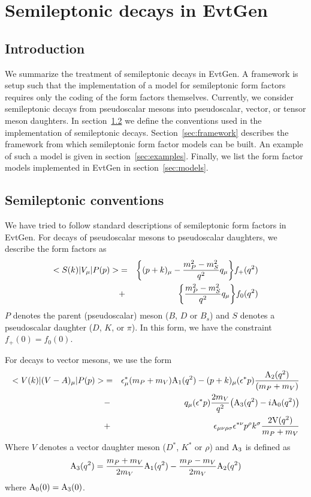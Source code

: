 \section{Semileptonic decays in EvtGen}
\label{semileptonic}

\label{Semileptonic decays}
\subsection{Introduction}
We summarize the treatment of semileptonic decays in
EvtGen.  A framework is setup such that the implementation of
a model for semileptonic form factors requires only the 
coding of the form factors themselves.  Currently, we consider
semileptonic decays from pseudoscalar mesons into 
pseudoscalar, vector, or tensor meson daughters.
In section~\ref{sec:conventions} we define the
conventions used in the implementation of semileptonic
decays.  Section~\ref{sec:framework} describes the framework
from which semileptonic form factor models can be built.  An
example of such a model is given in section~\ref{sec:examples}.
Finally, we list the form factor models implemented in EvtGen
in section~\ref{sec:models}.

\subsection{Semileptonic conventions}
\label{sec:conventions}
We have tried to follow standard descriptions of semileptonic
form factors in EvtGen.  
For decays of 
pseudoscalar mesons to pseudoscalar daughters, we describe the
form factors as
\begin{eqnarray}
<S(k) \vert V_{\mu} \vert P(p) > & = &\biggl \{ (p+k)_{\mu} - 
{{m_P^2 - m_S^2} \over {q^2}} q_{\mu} \biggr \} f_+(q^2) \\
&+& 
\biggl \{  {{m_P^2 - m_S^2} \over {q^2}} q_{\mu} \biggr \} f_0(q^2) 
\nonumber
\end{eqnarray}
$P$ denotes the parent (pseudoscalar) meson ($B$, $D$ or $B_s$) and 
$S$ denotes a pseudoscalar daughter ($D$, $K$, or $\pi$).  In this
form, we have the constraint $f_+(0) = f_0(0)$. 

\noindent
For decays to vector mesons, we use the form
\begin{eqnarray}
<V(k) \vert (V-A)_{\mu} \vert P(p) > & = & 
 \epsilon^*_{\mu} (m_P+m_V) {\rm A}_1(q^2)
- (p+k)_{\mu} ( \epsilon^* p) { { {\rm A}_2(q^2)} \over {(m_P + m_V)}} \\
&-& q_{\mu} ( \epsilon^* p) { {2 m_V} \over {q^2}} \bigl ({\rm A}_3(q^2)
- i{\rm A}_0(q^2) \bigr ) \nonumber
\\
&+&\epsilon_{\mu \nu \rho \sigma} \epsilon^{* \nu} p^{\rho} k^{\sigma}
{ {2 {\rm V}(q^2)} \over { m_P + m_V} } \nonumber
\end{eqnarray}
Where $V$ denotes a vector daughter meson ($D^*$, $K^*$ or $\rho$)
and ${\rm A}_3$ is defined as 
\begin{equation}
{\rm A}_3(q^2) = {{m_P+ m_V} \over {2 m_V}} {\rm A}_1(q^2) -
{{m_P- m_V} \over {2 m_V}} {\rm A}_2(q^2) 
\end{equation}
where ${\rm A}_0 (0) = {\rm A}_3(0)$. \nonumber


